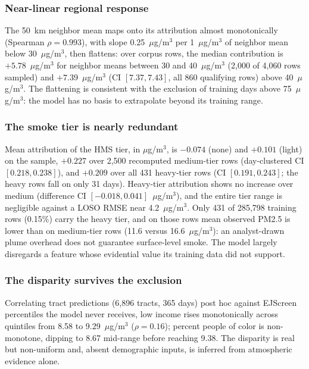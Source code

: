 \documentclass[conference]{IEEEtran}
\newcommand{\ugm}{$\mu$g/m$^3$}
\begin{document}
\subsubsection{Near-linear regional response} The 50~km neighbor mean
maps onto its attribution almost monotonically (Spearman $\rho=0.993$),
with slope 0.25~\ugm{} per 1~\ugm{} of neighbor mean below 30~\ugm{},
then flattens: over corpus rows, the median contribution is
$+5.78$~\ugm{} for neighbor means between 30 and 40~\ugm{} (2,000 of
4,060 rows sampled) and $+7.39$~\ugm{} (CI $[7.37, 7.43]$, all 860
qualifying rows) above 40~\ugm{}. The flattening is consistent with the
exclusion of training days above 75~\ugm{}: the model has no basis to
extrapolate beyond its training range.

\subsubsection{The smoke tier is nearly redundant} Mean attribution of
the HMS tier, in \ugm{}, is $-0.074$ (none) and $+0.101$ (light) on the
sample, $+0.227$ over 2,500 recomputed medium-tier rows (day-clustered CI
$[0.218, 0.238]$), and $+0.209$ over all 431 heavy-tier rows (CI
$[0.191, 0.243]$; the heavy rows fall on only 31 days). Heavy-tier
attribution shows no increase over medium (difference CI
$[-0.018, 0.041]$~\ugm{}), and the entire tier range is negligible
against a LOSO RMSE near 4.2~\ugm{}. Only 431 of 285,798 training rows
(0.15\%) carry the heavy tier, and on those rows mean observed PM2.5 is
lower than on medium-tier rows (11.6 versus 16.6~\ugm{}): an
analyst-drawn plume overhead does not guarantee surface-level smoke. The
model largely disregards a feature whose evidential value its training
data did not support.

\subsubsection{The disparity survives the exclusion} Correlating tract
predictions (6,896 tracts, 365 days) post hoc against EJScreen
percentiles the model never receives, low income rises monotonically
across quintiles from 8.58 to 9.29~\ugm{} ($\rho=0.16$); percent people
of color is non-monotone, dipping to 8.67 mid-range before reaching 9.38.
The disparity is real but non-uniform and, absent demographic inputs, is
inferred from atmospheric evidence alone.
\end{document}
